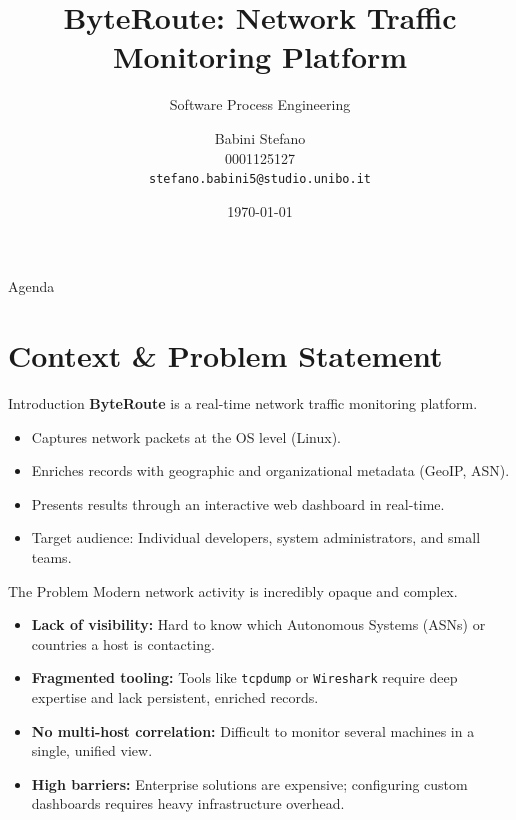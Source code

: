 \documentclass[aspectratio=169]{beamer}
\title[ByteRoute]{ByteRoute: Network Traffic Monitoring Platform}
\subtitle{Software Process Engineering}
\author[Babini Stefano]{
    Babini Stefano \\
    \small 0001125127 \\
    \footnotesize \texttt{stefano.babini5@studio.unibo.it}
}
\institute[Unibo]{University of Bologna}
\date{\today}
\begin{document}
\begin{frame}
    \titlepage
\end{frame}

\begin{frame}{Agenda}
    \tableofcontents
\end{frame}

\section{Context \& Problem Statement}

\begin{frame}{Introduction}
    \textbf{ByteRoute} is a real-time network traffic monitoring platform.
    \vspace{0.5cm}
    \begin{itemize}
        \item Captures network packets at the OS level (Linux).
        \item Enriches records with geographic and organizational metadata (GeoIP, ASN).
        \item Presents results through an interactive web dashboard in real-time.
        \item Target audience: Individual developers, system administrators, and small teams.
    \end{itemize}
\end{frame}

\begin{frame}{The Problem}
    Modern network activity is incredibly opaque and complex.
    \vspace{0.5cm}
    \begin{itemize}
        \item \textbf{Lack of visibility:} Hard to know which Autonomous Systems (ASNs) or countries a host is contacting.
        \item \textbf{Fragmented tooling:} Tools like \texttt{tcpdump} or \texttt{Wireshark} require deep expertise and lack persistent, enriched records.
        \item \textbf{No multi-host correlation:} Difficult to monitor several machines in a single, unified view.
        \item \textbf{High barriers:} Enterprise solutions are expensive; configuring custom dashboards requires heavy infrastructure overhead.
    \end{itemize}
\end{frame}
\end{document}
